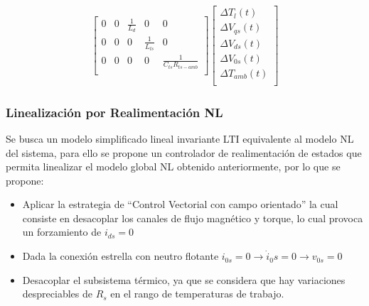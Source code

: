 \documentclass{article}
\begin{document}
\begin{itemize}
\begin{equation*}
\begin{gathered}
\begin{bmatrix}
        0 & 0 & \frac{1}{L_{d}} & 0 & 0\\
        0 & 0 & 0 & \frac{1}{L_{ls}} & 0\\
        0 & 0 & 0 & 0 & \frac{1}{C_{ts}R_{ts-amb}}\\
    \end{bmatrix}
    \begin{bmatrix}
        \Delta{T}_{l}(t)\\
        \Delta{V}_{qs}(t)\\
        \Delta{V}_{ds}(t)\\
        \Delta{V}_{0s}(t)\\
        \Delta T_{amb}(t)\\
    \end{bmatrix} 
\end{gathered}
\end{equation*}

\end{itemize}


\subsubsection{Linealización por Realimentación NL}

Se busca un modelo simplificado lineal invariante LTI equivalente al modelo NL del sistema, 
para ello se propone un controlador de realimentación de estados que permita linealizar el 
modelo global NL obtenido anteriormente, por lo que se propone:

\begin{itemize}
    \item Aplicar la estrategia de “Control Vectorial con campo orientado” la cual 
    consiste en desacoplar los canales de flujo magnético y torque, lo cual provoca
    un forzamiento de $i_{ds}=0$ 
    \item Dada la conexión estrella con neutro flotante $i_{0s} = 0 \to \dot{i}_0s = 0 \to v_{0s} = 0$
    \item Desacoplar el subsistema térmico, ya que se considera que hay variaciones despreciables 
    de $R_s$ en el rango de temperaturas de trabajo.
\end{itemize}
\end{document}
